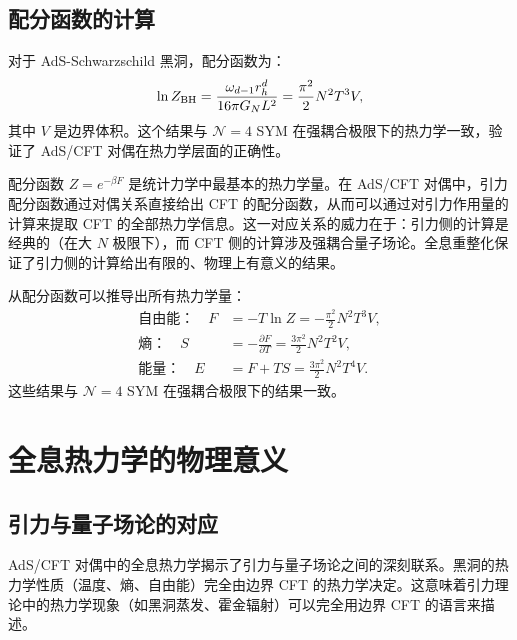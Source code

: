 \subsection{配分函数的计算}

对于 AdS-Schwarzschild 黑洞，配分函数为：
\begin{equation}
    \ln Z_{\rm BH} = \frac{\omega_{d-1} r_h^d}{16\pi G_N L^2} = \frac{\pi^2}{2} N^2 T^3 V,
\end{equation}
其中 $V$ 是边界体积。这个结果与 $\mathcal{N}=4$ SYM 在强耦合极限下的热力学一致，验证了 AdS/CFT 对偶在热力学层面的正确性。

\begin{note}[配分函数作为热力学势]
配分函数 $Z = e^{-\beta F}$ 是统计力学中最基本的热力学量。在 AdS/CFT 对偶中，引力配分函数通过对偶关系直接给出 CFT 的配分函数，从而可以通过对引力作用量的计算来提取 CFT 的全部热力学信息。这一对应关系的威力在于：引力侧的计算是经典的（在大 $N$ 极限下），而 CFT 侧的计算涉及强耦合量子场论。全息重整化\cite{Skenderis2002}保证了引力侧的计算给出有限的、物理上有意义的结果。
\end{note}

\begin{example}[配分函数与热力学量的关系]
从配分函数可以推导出所有热力学量：
\begin{align}
    \text{自由能：} \quad F &= -T \ln Z = -\frac{\pi^2}{2} N^2 T^3 V, \\
    \text{熵：} \quad S &= -\frac{\partial F}{\partial T} = \frac{3\pi^2}{2} N^2 T^2 V, \\
    \text{能量：} \quad E &= F + TS = \frac{3\pi^2}{2} N^2 T^4 V.
\end{align}
这些结果与 $\mathcal{N}=4$ SYM 在强耦合极限下的结果一致\cite{Aharony1999}。
\end{example}

\section{全息热力学的物理意义}

\subsection{引力与量子场论的对应}

AdS/CFT 对偶\cite{Maldacena1997,Witten1998,Aharony1999}中的全息热力学揭示了引力与量子场论之间的深刻联系。黑洞的热力学性质（温度、熵、自由能）完全由边界 CFT 的热力学决定。这意味着引力理论中的热力学现象（如黑洞蒸发、霍金辐射）可以完全用边界 CFT 的语言来描述。

